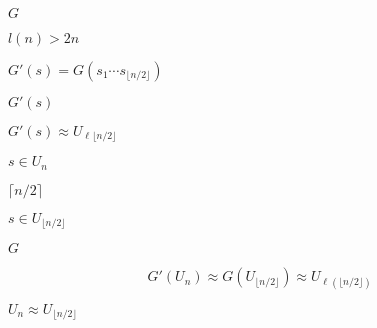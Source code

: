 \documentclass[10pt]{book}
\begin{document}
\begin{mdSnippets}
\newcommand{\zo}{\{0,1\}}
\newcommand{\E}{\mathbb{E}}
\newcommand{\Z}{\mathbb{Z}}
\newcommand{\getsr}{\leftarrow_R\;}

\begin{mdInlineSnippet}[dfcf28d0734569a6a693bc8194de62bf]%
$G$\end{mdInlineSnippet}%
\begin{mdInlineSnippet}%
$l(n) > 2n$\end{mdInlineSnippet}%
\begin{mdInlineSnippet}[fb9cbf9c132c659e8b31d96eb5a2d3cc]%
$G'(s) = G(s_1\cdots s_{\lfloor n /2 \rfloor})$\end{mdInlineSnippet}%
\begin{mdInlineSnippet}%
$G'(s)$\end{mdInlineSnippet}%
\begin{mdInlineSnippet}%
$G'(s) \approx U_{\ell{\lfloor n/2 \rfloor}}$\end{mdInlineSnippet}%
\begin{mdInlineSnippet}[b9a461c0b9c14ac0cec4e7004817767f]%
$s \in U_{n}$\end{mdInlineSnippet}%
\begin{mdInlineSnippet}%
$\lceil n/2 \rceil $\end{mdInlineSnippet}%
\begin{mdInlineSnippet}%
$s \in U_{\lfloor n/2 \rfloor }$\end{mdInlineSnippet}%
\begin{mdInlineSnippet}[dfcf28d0734569a6a693bc8194de62bf]%
$G$\end{mdInlineSnippet}%
\begin{mdDisplaySnippet}[e23e0df40925fbc7e4ce52cd06a25997]%
\[%
G'(U_{n}) \approx G(U_{\lfloor n/2 \rfloor}) \approx U_{\ell(\lfloor n/2 \rfloor)} 
\]%
\end{mdDisplaySnippet}%
\begin{mdInlineSnippet}[cea93cf3155fe4db6f7e8c072485e025]%
$U_n \approx U_{\lfloor n / 2\rfloor}$\end{mdInlineSnippet}%

\end{mdSnippets}
\end{document}
